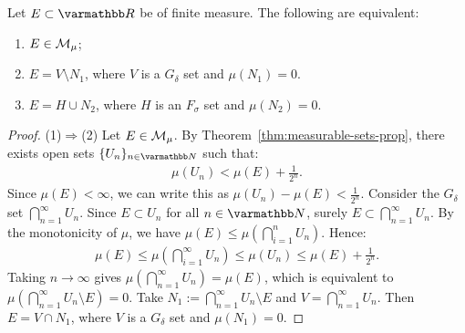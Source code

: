     \begin{theorem}
        Let $E \subset \bfR$ be of finite measure. The following are equivalent:
            \begin{enumerate}[label = (\arabic*),itemsep=1pt,topsep=3pt]
                \item $E \in \mathcal{M}_\mu$;
                \item $E = V \setminus N_1$, where $V$ is a $G_\delta$ set and $\mu(N_1) = 0$.
                \item $E = H \cup N_2$, where $H$ is an $F_\sigma$ set and $\mu(N_2) = 0$.
            \end{enumerate}
    \end{theorem}
        \begin{proof}
            (1)$\Rightarrow$(2) Let $E \in \mathcal{M}_\mu$. By Theorem~\ref{thm:measurable-sets-prop}, there exists open sets $\{U_n\}_{n \in \bfN}$ such that:
                \begin{equation*}
                \begin{split}
                    \mu(U_n)  < \mu(E) + \frac{1}{2^n}. 
                \end{split}
                \end{equation*}
            Since $\mu(E) < \infty$, we can write this as $\mu(U_n)  - \mu(E) < \frac{1}{2^n}$. Consider the $G_\delta$ set $\bigcap_{n = 1}^\infty U_n$. Since $E \subset U_n$ for all $n \in \bfN$, surely $E \subset \bigcap_{n = 1}^\infty U_n$. By the monotonicity of $\mu$, we have $\mu(E) \leq \mu \left( \bigcap_{i = 1}^n U_n \right)$. Hence:
                \begin{equation*}
                \begin{split}
                    \mu(E) \leq \mu \left( \bigcap_{i = 1}^\infty U_n \right) \leq \mu(U_n) \leq \mu(E) + \frac{1}{2^n}.
                \end{split}
                \end{equation*}
            Taking $n \rightarrow \infty$ gives $\mu \left( \bigcap_{n = 1}^\infty U_n \right) = \mu(E)$, which is equivalent to $\mu \left( \bigcap_{n = 1}^\infty U_n \setminus E \right) = 0$. Take $N_1 := \bigcap_{n = 1}^\infty U_n \setminus E$ and $V = \bigcap_{n = 1}^\infty U_n$. Then $E = V \cap N_1$, where $V$ is a $G_\delta$ set and $\mu(N_1) = 0$.


\end{proof}
